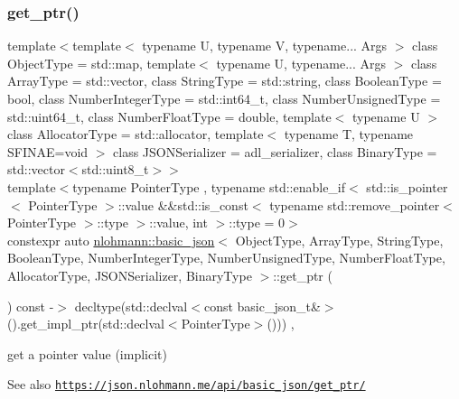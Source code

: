 \subsubsection{\texorpdfstring{get\+\_\+ptr()}{get\_ptr()}\hspace{0.1cm}{\footnotesize\ttfamily [2/2]}}
{\footnotesize\ttfamily template$<$template$<$ typename U, typename V, typename... Args $>$ class Object\+Type = std\+::map, template$<$ typename U, typename... Args $>$ class Array\+Type = std\+::vector, class String\+Type  = std\+::string, class Boolean\+Type  = bool, class Number\+Integer\+Type  = std\+::int64\+\_\+t, class Number\+Unsigned\+Type  = std\+::uint64\+\_\+t, class Number\+Float\+Type  = double, template$<$ typename U $>$ class Allocator\+Type = std\+::allocator, template$<$ typename T, typename S\+F\+I\+N\+A\+E=void $>$ class J\+S\+O\+N\+Serializer = adl\+\_\+serializer, class Binary\+Type  = std\+::vector$<$std\+::uint8\+\_\+t$>$$>$ \\
template$<$typename Pointer\+Type , typename std\+::enable\+\_\+if$<$ std\+::is\+\_\+pointer$<$ Pointer\+Type $>$\+::value \&\&std\+::is\+\_\+const$<$ typename std\+::remove\+\_\+pointer$<$ Pointer\+Type $>$\+::type $>$\+::value, int $>$\+::type  = 0$>$ \\
constexpr auto \hyperlink{classnlohmann_1_1basic__json}{nlohmann\+::basic\+\_\+json}$<$ Object\+Type, Array\+Type, String\+Type, Boolean\+Type, Number\+Integer\+Type, Number\+Unsigned\+Type, Number\+Float\+Type, Allocator\+Type, J\+S\+O\+N\+Serializer, Binary\+Type $>$\+::get\+\_\+ptr (\begin{DoxyParamCaption}{ }\end{DoxyParamCaption}) const -\/$>$ decltype(std\+::declval$<$const basic\+\_\+json\+\_\+t\&$>$().get\+\_\+impl\+\_\+ptr(std\+::declval$<$Pointer\+Type$>$()))
    \hspace{0.3cm}{\ttfamily [inline]}, {\ttfamily [noexcept]}}



get a pointer value (implicit) 

\begin{DoxySeeAlso}{See also}
\href{https://json.nlohmann.me/api/basic_json/get_ptr/}{\tt https\+://json.\+nlohmann.\+me/api/basic\+\_\+json/get\+\_\+ptr/} 
\end{DoxySeeAlso}
\mbox{\label{classnlohmann_1_1basic__json_a14ddc6e0f6d70296bc81f810254076c5}} 
